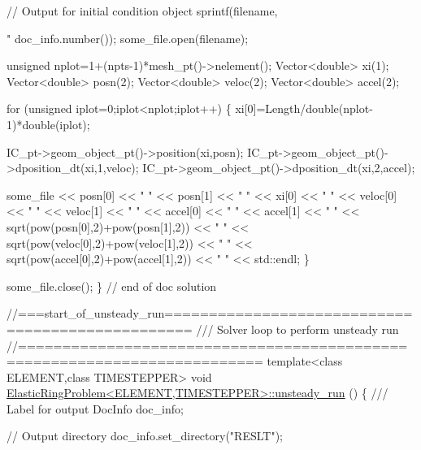 \begin{DoxyCodeInclude}
{{ \textcolor{comment}{// Output for initial condition object}
 sprintf(filename,\textcolor{stringliteral}{"%
         doc\_info.number());
 some\_file.open(filename);
  
 \textcolor{keywordtype}{unsigned} nplot=1+(npts-1)*mesh\_pt()->nelement();
 Vector<double> xi(1);
 Vector<double> posn(2);
 Vector<double> veloc(2);
 Vector<double> accel(2);
  
 \textcolor{keywordflow}{for} (\textcolor{keywordtype}{unsigned} iplot=0;iplot<nplot;iplot++)
  \{
   xi[0]=Length/double(nplot-1)*double(iplot);
    
   IC\_pt->geom\_object\_pt()->position(xi,posn);
   IC\_pt->geom\_object\_pt()->dposition\_dt(xi,1,veloc);
   IC\_pt->geom\_object\_pt()->dposition\_dt(xi,2,accel);
    
   some\_file << posn[0] << \textcolor{stringliteral}{" "} << posn[1] << \textcolor{stringliteral}{" "}
             << xi[0] << \textcolor{stringliteral}{" "}
             << veloc[0] << \textcolor{stringliteral}{" "} << veloc[1] << \textcolor{stringliteral}{" "}
             << accel[0] << \textcolor{stringliteral}{" "} << accel[1] << \textcolor{stringliteral}{" "}
             << sqrt(pow(posn[0],2)+pow(posn[1],2)) << \textcolor{stringliteral}{" "}
             << sqrt(pow(veloc[0],2)+pow(veloc[1],2)) << \textcolor{stringliteral}{" "}
             << sqrt(pow(accel[0],2)+pow(accel[1],2)) << \textcolor{stringliteral}{" "}
             << std::endl;
  \}
  
 some\_file.close();
\} \textcolor{comment}{// end of doc solution}



\textcolor{comment}{//===start\_of\_unsteady\_run=================================================}\textcolor{comment}{}
\textcolor{comment}{/// Solver loop to perform unsteady run}
\textcolor{comment}{}\textcolor{comment}{//=========================================================================}
\textcolor{keyword}{template}<\textcolor{keyword}{class} ELEMENT,\textcolor{keyword}{class} TIMESTEPPER>
\textcolor{keywordtype}{void} \hyperlink{classElasticRingProblem_acd30c4363ffedbaadc1523aa8b85523b}{ElasticRingProblem<ELEMENT,TIMESTEPPER>::unsteady\_run}
      ()
\{
\textcolor{comment}{}
\textcolor{comment}{ /// Label for output}
\textcolor{comment}{} DocInfo doc\_info;

 \textcolor{comment}{// Output directory}
 doc\_info.set\_directory(\textcolor{stringliteral}{"RESLT"});

}}}
\end{DoxyCodeInclude}
